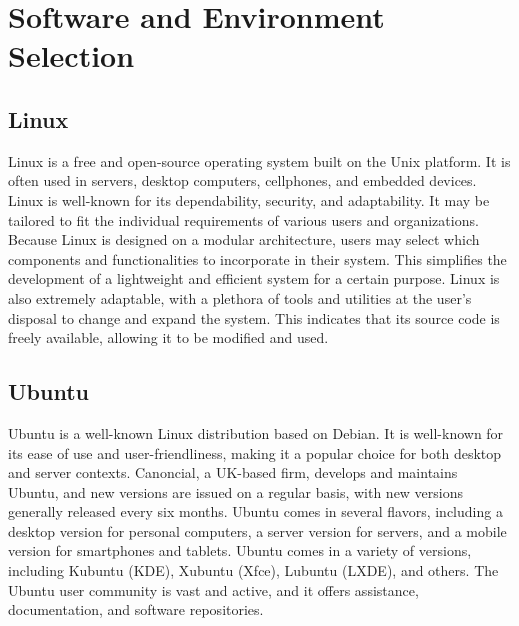 \documentclass[11pt, a4paper, openany]{book}
\begin{document}
\section{Software and Environment Selection} 
\subsection{Linux}
Linux is a free and open-source operating system built on the Unix platform. It is often used in servers, desktop computers, cellphones, and embedded devices. Linux is well-known for its dependability, security, and adaptability. It may be tailored to fit the individual requirements of various users and organizations. Because Linux is designed on a modular architecture, users may select which components and functionalities to incorporate in their system. This simplifies the development of a lightweight and efficient system for a certain purpose. Linux is also extremely adaptable, with a plethora of tools and utilities at the user's disposal to change and expand the system. This indicates that its source code is freely available, allowing it to be modified and used.~\cite{thomas2006beginning}
\subsection{Ubuntu}
Ubuntu is a well-known Linux distribution based on Debian. It is well-known for its ease of use and user-friendliness, making it a popular choice for both desktop and server contexts. Canoncial, a UK-based firm, develops and maintains Ubuntu, and new versions are issued on a regular basis, with new versions generally released every six months. Ubuntu comes in several flavors, including a desktop version for personal computers, a server version for servers, and a mobile version for smartphones and tablets. Ubuntu comes in a variety of versions, including Kubuntu (KDE), Xubuntu (Xfce), Lubuntu (LXDE), and others. The Ubuntu user community is vast and active, and it offers assistance, documentation, and software repositories.~\cite{wei2016rt}
\end{document}
